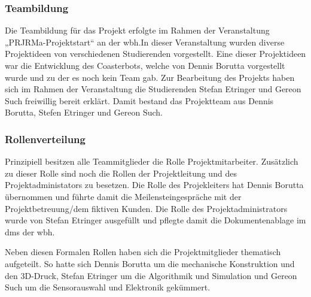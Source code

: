 \subsubsection*{Teambildung}
Die Teambildung für das Projekt erfolgte im Rahmen der Veranstaltung „PRJRMa-Projektstart“ an der \gls{wbh}.\@ In dieser Veranstaltung wurden diverse Projektideen von verschiedenen Studierenden vorgestellt. Eine dieser Projektideen war die Entwicklung des Coasterbots, welche von Dennis Borutta vorgestellt wurde und zu der es noch kein Team gab. Zur Bearbeitung des Projekts haben sich im Rahmen der Veranstaltung die Studierenden Stefan Etringer und Gereon Such freiwillig bereit erklärt. Damit bestand das Projektteam aus Dennis Borutta, Stefen Etringer und Gereon Such.

\subsubsection*{Rollenverteilung}
Prinzipiell besitzen alle Teammitglieder die Rolle Projektmitarbeiter. Zusätzlich zu dieser Rolle sind noch die Rollen der Projektleitung und des Projektadministators zu besetzen. Die Rolle des Projekleiters hat Dennis Borutta übernommen und führte damit die Meilensteingespräche mit der Projektbetreuung/dem fiktiven Kunden. Die Rolle des Projektadministrators wurde von Stefan Etringer ausgefüllt und pflegte damit die Dokumentenablage im \gls{dms} der \gls{wbh}.\@

Neben diesen Formalen Rollen haben sich die Projektmitglieder thematisch aufgeteilt. So hatte sich Dennis Borutta um die mechanische Konstruktion und den 3D-Druck, Stefan Etringer um die Algorithmik und Simulation und Gereon Such um die Sensorauswahl und Elektronik gekümmert.
